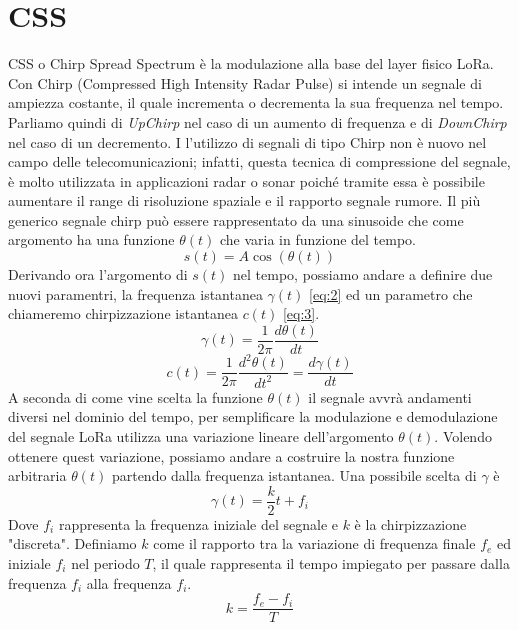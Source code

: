 \section{CSS}
CSS o Chirp Spread Spectrum è la modulazione alla base del layer fisico LoRa. 
Con Chirp (Compressed High Intensity Radar Pulse) si intende un segnale di
ampiezza costante, il quale incrementa o decrementa la sua frequenza nel tempo.
Parliamo quindi di \emph{UpChirp} nel caso di un aumento di frequenza e di
\emph{DownChirp} nel caso di un decremento.
I l'utilizzo di segnali di tipo Chirp non è nuovo nel campo delle
telecomunicazioni; infatti, questa tecnica di compressione del segnale, 
è molto utilizzata in applicazioni radar o  sonar  poiché tramite essa è possibile aumentare il range
di risoluzione spaziale e il rapporto segnale rumore.
Il più generico segnale chirp può essere rappresentato da una sinusoide che come
argomento ha una funzione $\theta(t)$ che varia in funzione del tempo.
\begin{equation}\label{eq:1}
        s(t) = A\cos(\theta (t))
\end{equation}
Derivando ora l'argomento di $s(t)$ nel tempo, possiamo andare a definire due
nuovi paramentri, la frequenza istantanea $\gamma(t)$ \ref{eq:2} ed un parametro che
chiameremo chirpizzazione istantanea $c(t)$ \ref{eq:3}.
\begin{equation}\label{eq:2}
        \gamma(t) = \frac{1}{2\pi} \frac{d\theta(t)}{dt}
\end{equation}
\begin{equation}\label{eq:3}
        c(t) = \frac{1}{2\pi} \frac{d^2\theta(t)}{dt^2} = \frac{d\gamma(t)}{dt}
\end{equation}
A seconda di come vine scelta la funzione $\theta(t)$ il segnale avvrà
andamenti diversi nel dominio del tempo, per semplificare la modulazione e
demodulazione del segnale LoRa utilizza una variazione lineare dell'argomento
$\theta(t)$.
Volendo ottenere quest variazione, possiamo andare a costruire la nostra
funzione arbitraria $\theta(t)$ partendo dalla frequenza istantanea. 
Una possibile scelta di $\gamma$ è 
\begin{equation}
        \gamma(t) = \frac{k}{2}t+f_i
\end{equation}
Dove $f_i$ rappresenta la frequenza iniziale del segnale e $k$ è la 
chirpizzazione "discreta". 
Definiamo $k$ come il rapporto tra la variazione di
frequenza finale $f_e$ ed iniziale $f_i$ nel periodo $T$, il quale rappresenta il
tempo impiegato per passare dalla frequenza $f_i$ alla frequenza $f_i$.
\begin{equation}
        k = \frac{f_e - f_i}{T}
\end{equation}

